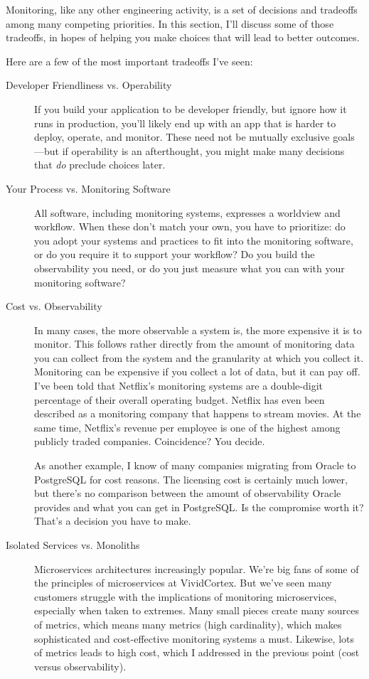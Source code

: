 \documentclass{vivid_layout}
\begin{document}
Monitoring, like any other engineering activity, is a set of decisions and
tradeoffs among many competing priorities. In this
section, I'll discuss some of those tradeoffs, in hopes of helping you make
choices that will lead to better outcomes.

Here are a few of the most important tradeoffs I've seen:

\begin{description}

\item[Developer Friendliness vs. Operability] If you build your application to be
developer friendly, but ignore how it runs in production, you'll
likely end up with an app that is harder to deploy, operate, and monitor. These need not
be mutually exclusive goals---but if operability is an afterthought, you might
make many decisions that \emph{do} preclude choices later.

\item[Your Process vs. Monitoring Software] All software, including monitoring
systems, expresses a worldview and workflow. When these don't match your own,
you have to prioritize: do you adopt your systems and practices to fit into
the monitoring software, or do you require it to support your workflow? Do you build
the observability you need, or do you just measure what you can with your monitoring software?

\item[Cost vs. Observability] In many cases, the more observable a system is, the
more expensive it is to monitor. This follows rather directly from the amount of
monitoring data you can collect from the system and the granularity at which you
collect it. Monitoring can be expensive if you collect a lot of data, but it can
pay off. I've been told that Netflix's monitoring systems are a double-digit
percentage of their overall operating budget. Netflix has even been described as
a monitoring company that happens to stream movies. At the same time, Netflix's
revenue per employee is one of the highest among publicly traded companies.
Coincidence? You decide.

As another example, I know of many companies migrating from Oracle to PostgreSQL
for cost reasons. The licensing cost is certainly much lower, but there's 
no comparison between the amount of observability Oracle provides and what you can
get in PostgreSQL. Is the compromise worth it? That's a decision you have to
make.

\item[Isolated Services vs. Monoliths] Microservices architectures increasingly popular. We're big fans of some of the principles of microservices at
VividCortex. But we've seen many customers struggle with the
implications of monitoring microservices, especially when taken to extremes.
Many small pieces create many sources of metrics, which means many metrics (high cardinality), which
makes sophisticated and cost-effective monitoring systems a must. Likewise, lots of metrics leads
to high cost, which I addressed in the previous point (cost versus
observability).


\end{description}
\end{document}
